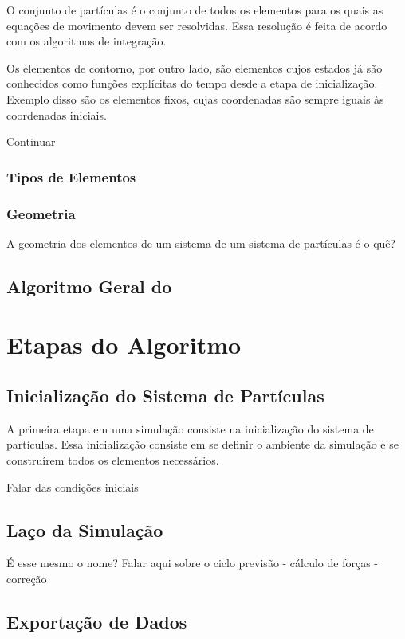 O conjunto de partículas é o conjunto de todos os elementos para os quais as equações de movimento devem ser resolvidas. Essa resolução é feita de acordo com os algoritmos de integração. 

Os elementos de contorno, por outro lado, são elementos cujos estados já são conhecidos como funções explícitas do tempo desde a etapa de inicialização. Exemplo disso são os elementos fixos, cujas coordenadas são sempre iguais às coordenadas iniciais.

\alert{Continuar}

\subsubsection{Tipos de Elementos}
\subsubsection{Geometria}

A geometria dos elementos de um sistema de um sistema de partículas é \alert{o quê?}

\subsection{Algoritmo Geral do \DEM{}} \label{sec:dem_algorithm}

\section{Etapas do Algoritmo}
\subsection{Inicialização do Sistema de Partículas}

A primeira etapa em uma simulação \DEM{} consiste na inicialização do sistema de partículas. Essa inicialização consiste em se definir o ambiente da simulação e se construírem todos os elementos necessários.

\alert{Falar das condições iniciais}

\subsection{Laço da Simulação}
\alert{É esse mesmo o nome? Falar aqui sobre o ciclo previsão - cálculo de forças - correção}

\subsection{Exportação de Dados}

